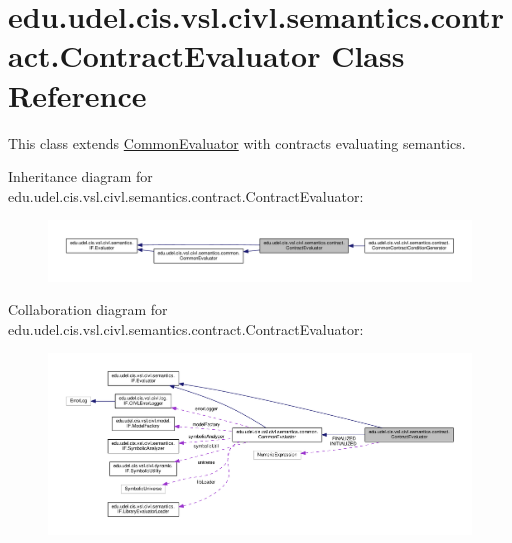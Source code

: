 \hypertarget{classedu_1_1udel_1_1cis_1_1vsl_1_1civl_1_1semantics_1_1contract_1_1ContractEvaluator}{}\section{edu.\+udel.\+cis.\+vsl.\+civl.\+semantics.\+contract.\+Contract\+Evaluator Class Reference}
\label{classedu_1_1udel_1_1cis_1_1vsl_1_1civl_1_1semantics_1_1contract_1_1ContractEvaluator}


This class extends \hyperlink{classedu_1_1udel_1_1cis_1_1vsl_1_1civl_1_1semantics_1_1common_1_1CommonEvaluator_a8746c4deea2a861efa0f60966058858b}{Common\+Evaluator} with contracts evaluating semantics.  




Inheritance diagram for edu.\+udel.\+cis.\+vsl.\+civl.\+semantics.\+contract.\+Contract\+Evaluator\+:
\nopagebreak
\begin{figure}[H]
\begin{center}
\leavevmode
\includegraphics[width=350pt]{classedu_1_1udel_1_1cis_1_1vsl_1_1civl_1_1semantics_1_1contract_1_1ContractEvaluator__inherit__graph}
\end{center}
\end{figure}


Collaboration diagram for edu.\+udel.\+cis.\+vsl.\+civl.\+semantics.\+contract.\+Contract\+Evaluator\+:
\nopagebreak
\begin{figure}[H]
\begin{center}
\leavevmode
\includegraphics[width=350pt]{classedu_1_1udel_1_1cis_1_1vsl_1_1civl_1_1semantics_1_1contract_1_1ContractEvaluator__coll__graph}
\end{center}
\end{figure}
